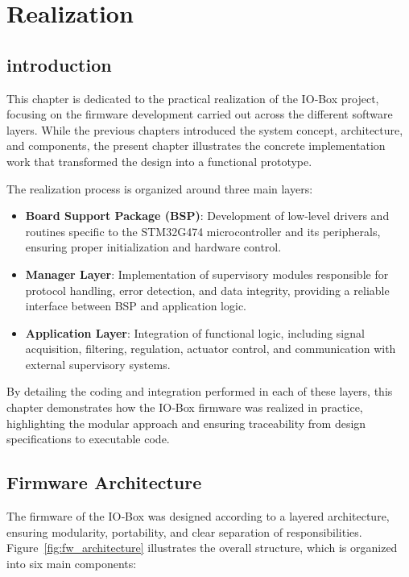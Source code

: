 \chapter{Realization}

\section{introduction} 
This chapter is dedicated to the practical realization of the IO‑Box project, focusing on
the firmware development carried out across the different software layers. While the
previous chapters introduced the system concept, architecture, and components, the
present chapter illustrates the concrete implementation work that transformed the design
into a functional prototype.

The realization process is organized around three main layers:
\begin{itemize}
    \item \textbf{Board Support Package (BSP)}: Development of low‑level drivers and
    routines specific to the STM32G474 microcontroller and its peripherals, ensuring
    proper initialization and hardware control.
    \item \textbf{Manager Layer}: Implementation of supervisory modules responsible
    for protocol handling, error detection, and data integrity, providing a reliable
    interface between BSP and application logic.
    \item \textbf{Application Layer}: Integration of functional logic, including signal
    acquisition, filtering, regulation, actuator control, and communication with external
    supervisory systems.
\end{itemize}

By detailing the coding and integration performed in each of these layers, this chapter
demonstrates how the IO‑Box firmware was realized in practice, highlighting the modular
approach and ensuring traceability from design specifications to executable code.

\section{Firmware Architecture}


The firmware of the IO‑Box was designed according to a layered architecture, ensuring
modularity, portability, and clear separation of responsibilities. Figure~\ref{fig:fw_architecture}
illustrates the overall structure, which is organized into six main components:


